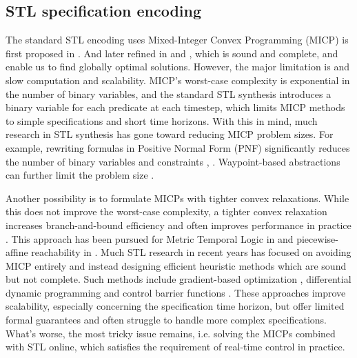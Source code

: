 \documentclass[a4paper]{report}
\begin{document}
\subsection{STL specification encoding} 
The standard STL encoding uses Mixed-Integer Convex Programming (MICP) is first proposed in \cite[]{raman2014model}. And later refined in \cite[]{sadraddini2015robust} and \cite[]{sadraddini2018formal}, which is sound and complete, and enable us to find globally optimal solutions. However, the major limitation is and slow computation and scalability. MICP’s worst-case complexity is exponential in the number of binary variables, and the standard STL synthesis introduces a binary variable for each predicate at each timestep, which limits MICP methods to simple specifications and short time horizons. With
this in mind, much research in STL synthesis has gone toward reducing MICP problem sizes. For example, rewriting formulas in Positive Normal Form (PNF) significantly reduces the number of binary variables and constraints \cite[]{raman2014model}, \cite[]{sadraddini2018formal}. Waypoint-based abstractions can further limit the problem
size \cite[]{conforti2014integer}.

Another possibility is to formulate MICPs with tighter convex relaxations. While this does not improve the worst-case complexity, a tighter convex relaxation increases branch-and-bound efficiency and often improves performance in practice \cite[]{conforti2014integer}. This approach has been pursued for Metric Temporal Logic in \cite[]{kurtz2021more} and piecewise-affine reachability in \cite[]{marcucci2021shortest}. Much STL research in recent years has focused on avoiding MICP entirely and instead designing efficient heuristic methods
which are sound but not complete. Such methods include gradient-based optimization \cite[]{gilpin2020smooth} \cite[]{mehdipour2019arithmetic} \cite[]{leung2020back}, differential dynamic programming \cite[]{kurtz2020trajectory} and control barrier functions \cite[]{lindemann2018control}. These approaches improve scalability, especially concerning the specification time horizon, but offer limited formal guarantees and often struggle to handle more complex specifications. What's worse, the most tricky issue remains, i.e. solving the MICPs combined with STL online, which satisfies the requirement of real-time control in practice.
\end{document}
